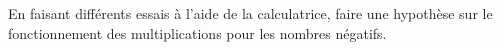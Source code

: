 
En faisant différents essais à l'aide de la calculatrice, faire une hypothèse sur le fonctionnement des multiplications pour les nombres négatifs.
